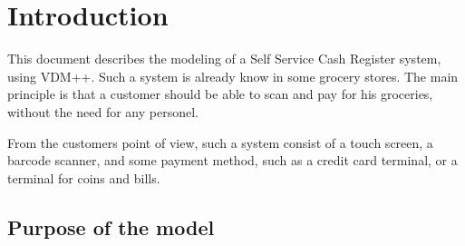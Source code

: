 \chapter{Introduction}
This document describes the modeling of a Self Service Cash Register system, using VDM++.
Such a system is already know in some grocery stores. 
The main principle is that a customer should be able to scan and pay for his groceries, without the need for any personel.

From the customers point of view, such a system consist of a touch screen, a barcode scanner, and some payment method, such as a credit card terminal, or a terminal for coins and bills.

\section{Purpose of the model}
